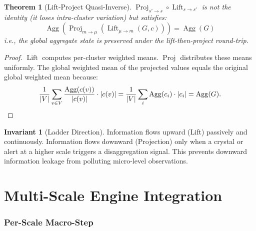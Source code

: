 \documentclass[11pt,a4paper,twoside]{article}
\theoremstyle{definition}
\newtheorem{invariant}{Invariant}[section]
\theoremstyle{plain}
\newtheorem{theorem}{Theorem}[section]
\theoremstyle{remark}
\DeclareMathOperator{\Lift}{Lift}
\DeclareMathOperator{\Proj}{Proj}
\DeclareMathOperator{\Agg}{Agg}
\newcommand{\abs}[1]{\left\lvert #1 \right\rvert}
\begin{document}
\begin{theorem}[Lift-Project Quasi-Inverse]\label{thm:liftproj}
$\Proj_{s' \to s} \circ \Lift_{s \to s'}$ is not the identity (it
loses intra-cluster variation) but satisfies:
\[
  \Agg(\Proj_{m \to \mu}(\Lift_{\mu \to m}(G, c))) = \Agg(G)
\]
i.e., the global aggregate state is preserved under the
lift-then-project round-trip.
\end{theorem}

\begin{proof}
$\Lift$ computes per-cluster weighted means. $\Proj$ distributes these
means uniformly. The global weighted mean of the projected values equals
the original global weighted mean because:
\[
  \frac{1}{\abs{V}} \sum_{v \in V} \frac{\Agg(c(v))}{\abs{c(v)}} \cdot \abs{c(v)}
  = \frac{1}{\abs{V}} \sum_{i} \Agg(c_i) \cdot \abs{c_i}
  = \Agg(G).
\qedhere
\]
\end{proof}

\begin{invariant}[Ladder Direction]\label{inv:ladderdir}
Information flows upward (Lift) passively and continuously. Information
flows downward (Projection) only when a crystal or alert at a higher
scale triggers a disaggregation signal. This prevents downward
information leakage from polluting micro-level observations.
\end{invariant}


\part{Multi-Scale Engine Integration}\label{part:engine}

\section{Per-Scale Macro-Step}\label{sec:perscale}
\end{document}
